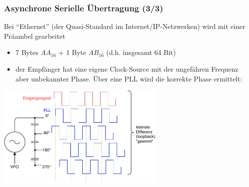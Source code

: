 \documentclass[ignorenonframetext]{beamer}
\begin{document}
\begin{frame}
\frametitle{Asynchrone Serielle \"Ubertragung (3/3)}
Bei ``Ethernet'' (der Quasi-Standard im Internet/IP-Netzwerken) wird mit einer Pr\"aambel gearbeitet
\begin{itemize}
\item 7 Bytes $AA_{16}$ + 1 Byte $AB_{16}$ {} (d.h. insgesamt 64 Bit)
\item der Empf\"anger hat eine eigene Clock-Source mit der ungef\"ahren Frequenz aber unbekannter Phase. \"Uber eine PLL wird die korrekte Phase ermittelt:
\end{itemize}
\includegraphics[height=5cm]{asynchron-ethernet}
\end{frame}
\end{document}
